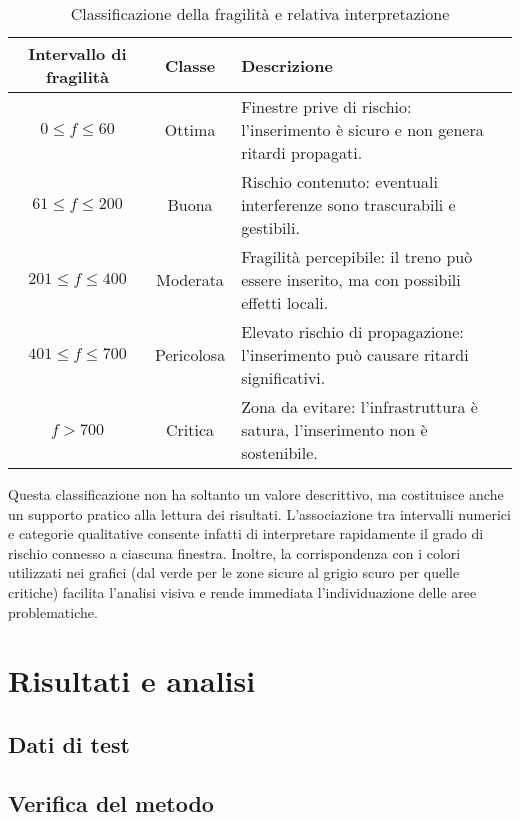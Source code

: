 \documentclass[a4paper,12pt]{report}
\begin{document}
\begin{table}[h!]
    \centering
    \begin{tabular}{|c|c|p{5cm}|}
        \hline
        \textbf{Intervallo di fragilità} & \textbf{Classe} & \textbf{Descrizione} \\
        \hline
        $0 \leq f \leq 60$   & Ottima     & Finestre prive di rischio: l'inserimento è sicuro e non genera ritardi propagati. \\
        \hline
        $61 \leq f \leq 200$ & Buona      & Rischio contenuto: eventuali interferenze sono trascurabili e gestibili. \\
        \hline
        $201 \leq f \leq 400$ & Moderata   & Fragilità percepibile: il treno può essere inserito, ma con possibili effetti locali. \\
        \hline
        $401 \leq f \leq 700$ & Pericolosa & Elevato rischio di propagazione: l’inserimento può causare ritardi significativi. \\
        \hline
        $f > 700$             & Critica    & Zona da evitare: l'infrastruttura è satura, l’inserimento non è sostenibile. \\
        \hline
    \end{tabular}
    \caption{Classificazione della fragilità e relativa interpretazione}
    \label{tab:fragilita}
\end{table} 
Questa classificazione non ha soltanto un valore descrittivo, ma costituisce anche un supporto pratico alla lettura dei risultati. L’associazione tra intervalli numerici e categorie qualitative consente infatti di interpretare rapidamente il grado di rischio connesso a ciascuna finestra. Inoltre, la corrispondenza con i colori utilizzati nei grafici (dal verde per le zone sicure al grigio scuro per quelle critiche) facilita l’analisi visiva e rende immediata l’individuazione delle aree problematiche.

\chapter{Risultati e analisi}
\section{Dati di test}
\section{Verifica del metodo}
\end{document}
